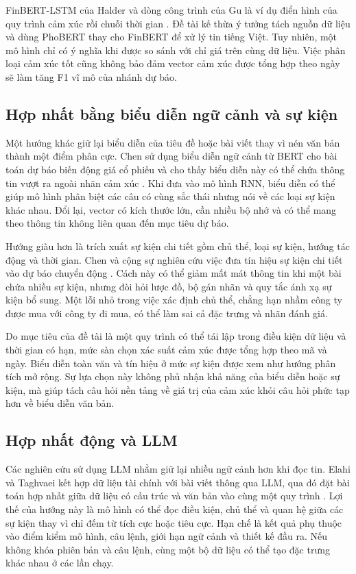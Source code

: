 FinBERT-LSTM của Halder và dòng công trình của Gu là ví dụ điển hình của quy trình
cảm xúc rồi chuỗi thời gian \cite{Halder2022_221107392v1,Gu2024_240716150v1}.
Đề tài kế thừa ý tưởng tách nguồn dữ liệu và dùng PhoBERT thay cho FinBERT để xử lý
tin tiếng Việt. Tuy nhiên, một mô hình chỉ có ý nghĩa khi được so sánh với chỉ giá
trên cùng dữ liệu. Việc phân loại cảm xúc tốt cũng không bảo đảm vector cảm xúc
được tổng hợp theo ngày sẽ làm tăng F1 vĩ mô của nhánh dự báo.

\subsection{Hợp nhất bằng biểu diễn ngữ cảnh và sự kiện}

Một hướng khác giữ lại biểu diễn của tiêu đề hoặc bài viết thay vì nén văn bản thành
một điểm phân cực. Chen sử dụng biểu diễn ngữ cảnh từ BERT cho bài toán dự báo biến động giá cổ phiếu
và cho thấy biểu diễn này có thể chứa thông tin vượt ra ngoài nhãn cảm xúc
\cite{Chen2021_210708721v1}. Khi đưa vào mô hình RNN, biểu diễn có thể giúp mô hình
phân biệt các câu có cùng sắc thái nhưng nói về các loại sự kiện khác nhau. Đổi lại,
vector có kích thước lớn, cần nhiều bộ nhớ và có thể mang theo thông tin không liên
quan đến mục tiêu dự báo.

Hướng giàu hơn là trích xuất sự kiện chi tiết gồm chủ thể, loại sự kiện, hướng tác
động và thời gian. Chen và cộng sự nghiên cứu việc đưa tín hiệu sự kiện chi tiết
vào dự báo chuyển động \cite{Chen2019_191005078v1}. Cách này có thể giảm mất mát thông
tin khi một bài chứa nhiều sự kiện, nhưng đòi hỏi lược đồ, bộ gán nhãn và quy tắc ánh
xạ sự kiện bổ sung. Một lỗi nhỏ trong việc xác định chủ thể, chẳng hạn nhầm công ty
được mua với công ty đi mua, có thể làm sai cả đặc trưng và nhãn đánh giá.

Do mục tiêu của đề tài là một quy trình có thể tái lập trong điều kiện dữ liệu và thời
gian có hạn, mức sàn chọn xác suất cảm xúc được tổng hợp theo mã và ngày. Biểu diễn
toàn văn và tín hiệu ở mức sự kiện được xem như hướng phân tích mở rộng. Sự lựa chọn này
không phủ nhận khả năng của biểu diễn hoặc sự kiện, mà giúp tách câu hỏi nền tảng về
giá trị của cảm xúc khỏi câu hỏi phức tạp hơn về biểu diễn văn bản.

\subsection{Hợp nhất động và LLM}

Các nghiên cứu sử dụng LLM nhằm giữ lại nhiều ngữ cảnh hơn khi đọc tin.
Elahi và Taghvaei kết hợp dữ liệu tài chính với bài viết thông qua LLM, qua đó đặt
bài toán hợp nhất giữa dữ liệu có cấu trúc và văn bản vào cùng một quy trình
\cite{Elahi2024_241101368v1}. Lợi thế của hướng này là mô hình có thể đọc điều kiện,
chủ thể và quan hệ giữa các sự kiện thay vì chỉ đếm từ tích cực hoặc tiêu cực. Hạn
chế là kết quả phụ thuộc vào điểm kiểm mô hình, câu lệnh, giới hạn ngữ cảnh và thiết kế
đầu ra. Nếu không khóa phiên bản và câu lệnh, cùng một bộ dữ liệu có thể tạo đặc trưng
khác nhau ở các lần chạy.

